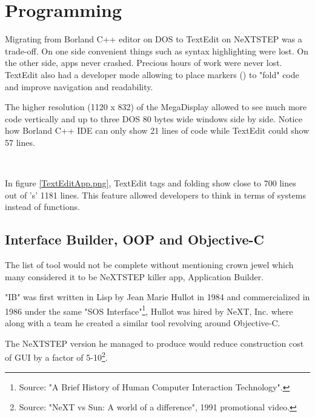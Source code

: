 
\section{Programming}
Migrating from Borland C++ editor on DOS to TextEdit on NeXTSTEP was a trade-off. On one side convenient things such as syntax highlighting were lost. On the other side, apps never crashed. Precious hours of work were never lost. TextEdit also had a developer mode allowing to place markers (\cw{//}) to "fold" code and improve navigation and readability.\\
\par
 The higher resolution (1120 x 832) of the MegaDisplay allowed to see much more code vertically and up to three DOS 80 bytes wide windows side by side. Notice how Borland C++ IDE can only show 21 lines of code while TextEdit could show 57 lines.\\
\par
{}\\

\vspace{-4mm}


In figure \ref{TextEditApp.png}, TextEdit tags and folding show close to 700 lines out of 's' 1181 lines. This feature allowed developers to think in terms of systems instead of functions.

\subsection{Interface Builder, OOP and Objective-C}
The list of tool would not be complete without mentioning \NeXT crown jewel which many considered it to be NeXTSTEP killer app, Application Builder.\\
\par
"IB" was first written in Lisp by Jean Marie Hullot in 1984 and commercialized in 1986 under the same "SOS Interface"\footnote{Source: "A Brief History of Human Computer Interaction Technology".}, Hullot was hired by NeXT, Inc. where along with a team he created a similar tool revolving around Objective-C.\\
\par
The NeXTSTEP version he managed to produce would reduce construction cost of GUI by a factor of 5-10\footnote{Source: "NeXT vs Sun: A world of a difference", 1991 promotional video.}.\\
\par
{}



